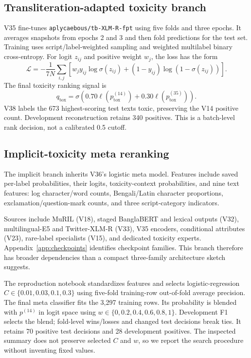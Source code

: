 \documentclass[10pt,a4paper]{article}
\newcommand{\checkpoint}[1]{{\small\nolinkurl{#1}}}
\begin{document}
\subsection{Transliteration-adapted toxicity branch}
V35 fine-tunes \checkpoint{aplycaebous/tb-XLM-R-fpt} using five folds and three epochs. It averages snapshots from epochs 2 and 3 and then fold predictions for the test set. Training uses script/label-weighted sampling and weighted multilabel binary cross-entropy. For logit $z_{ij}$ and positive weight $w_j$, the loss has the form
\begin{equation}
\mathcal L=-\frac{1}{7N}\sum_{i,j}\left[w_jy_{ij}\log\sigma(z_{ij})+
(1-y_{ij})\log(1-\sigma(z_{ij}))\right].
\end{equation}
The final toxicity ranking signal is
\begin{equation}
q_{\mathrm{tox}}=\sigma\!\left(0.70\ell(p^{(14)}_{\mathrm{tox}})
+0.30\ell(p^{(35)}_{\mathrm{tox}})\right).
\end{equation}
V38 labels the 673 highest-scoring test texts toxic, preserving the V14 positive count. Development reconstruction retains 340 positives. This is a batch-level rank decision, not a calibrated 0.5 cutoff.

\subsection{Implicit-toxicity meta reranking}
The implicit branch inherits V36's logistic meta model. Features include saved per-label probabilities, their logits, toxicity-context probabilities, and nine text features: log character/word counts, Bengali/Latin character proportions, exclamation/question-mark counts, and three script-category indicators.

Sources include MuRIL (V18), staged BanglaBERT and lexical outputs (V32), multilingual-E5 and Twitter-XLM-R (V33), V35 encoders, conditional attributes (V23), rare-label specialists (V15), and dedicated toxicity experts. Appendix~\ref{app:checkpoints} identifies checkpoint families. This branch therefore has broader dependencies than a compact three-family architecture sketch suggests.

The reproduction notebook standardizes features and selects logistic-regression $C\in\{0.01,0.03,0.1,0.3\}$ using five-fold training-row out-of-fold average precision. The final meta classifier fits the 3,297 training rows. Its probability is blended with $p^{(14)}$ in logit space using $w\in\{0,0.2,0.4,0.6,0.8,1\}$. Development F1 selects the blend; fold-level wins/losses and changed test decisions break ties. It retains 70 positive test decisions and 28 development positives. The inspected summary does not preserve selected $C$ and $w$, so we report the search procedure without inventing fixed values.
\end{document}
